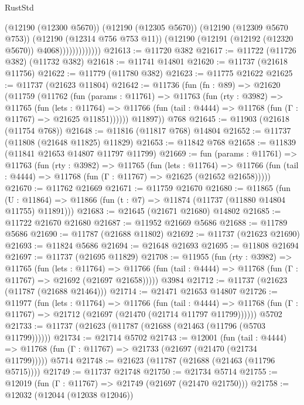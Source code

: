 \begin{lexlean}{RustStd}
\begin{coremodule}
                          (@12190 (@12300 @5670))
                          (@12190 (@12305 @5670))
                          (@12190 (@12309 @5670 @753))
                          (@12190 (@12314 @756 @753 @11))
                          (@12190 (@12191 (@12192 (@12320 @5670)) @4068)))))))))))))
@21613 := @11720 @382
@21617 := @11722 (@11726 @382) (@11732 @382)
@21618 := @11741 @14801
@21620 := @11737 (@21618 @11756)
@21622 := @11779 (@11780 @382)
@21623 := @11775 @21622
@21625 := @11737 (@21623 @11804)
@21642 := @11736
    (fun (fn : @89) =>
    @21620
      (@11759
        (@11762
          (fun (params : @11761) =>
          @11763
            (fun (rty : @3982) =>
            @11765
              (fun (lets : @11764) =>
              @11766 (fun (tail : @4444) => @11768 (fun (Γ : @11767) => @21625 @11851))))))
        @11897))
    @768
@21645 := @11903 (@21618 (@11754 @768))
@21648 := @11816 (@11817 @768) @14804
@21652 := @11737 (@11808 (@21648 @11825) @11829)
@21653 := @11842 @768
@21658 := @11839 (@11841 @21653 @14807 @11797 @11799)
@21669 := fun (params : @11761) =>
  @11763
    (fun (rty : @3982) =>
    @11765
      (fun (lets : @11764) =>
      @11766 (fun (tail : @4444) => @11768 (fun (Γ : @11767) => @21625 (@21652 @21658)))))
@21670 := @11762 @21669
@21671 := @11759 @21670
@21680 := @11865
    (fun (U : @11864) => @11866 (fun (t : @7) => @11874 (@11737 (@11880 @14804 @11755) @11891)))
@21683 := @21645 (@21671 @21680) @14802
@21685 := @11722 @21670 @21680
@21687 := @11952 @21669 @5686
@21688 := @11789 @5686
@21690 := @11787 (@21688 @11802)
@21692 := @11737 (@21623 @21690)
@21693 := @11824 @5686
@21694 := @21648 @21693
@21695 := @11808 @21694
@21697 := @11737 (@21695 @11829)
@21708 := @11955
    (fun (rty : @3982) =>
    @11765
      (fun (lets : @11764) =>
      @11766 (fun (tail : @4444) => @11768 (fun (Γ : @11767) => @21692 (@21697 @21658)))))
    @3984
@21712 := @11737 (@21623 (@11787 (@21688 @21464)))
@21714 := @21471 @21653 @14807
@21726 := @11977
    (fun (lets : @11764) =>
    @11766
      (fun (tail : @4444) =>
      @11768 (fun (Γ : @11767) => @21712 (@21697 (@21470 (@21714 @11797 @11799))))))
    @5702
@21733 := @11737 (@21623 (@11787 (@21688 (@21463 (@11796 (@5703 @11799))))))
@21734 := @21714 @5702
@21743 := @12001
    (fun (tail : @4444) => @11768 (fun (Γ : @11767) => @21733 (@21697 (@21470 (@21734 @11799)))))
    @5714
@21748 := @21623 (@11787 (@21688 (@21463 (@11796 @5715))))
@21749 := @11737 @21748
@21750 := @21734 @5714
@21755 := @12019 (fun (Γ : @11767) => @21749 (@21697 (@21470 @21750)))
@21758 := @12032 (@12044 (@12038 @12046))

\end{coremodule}
\end{lexlean}
